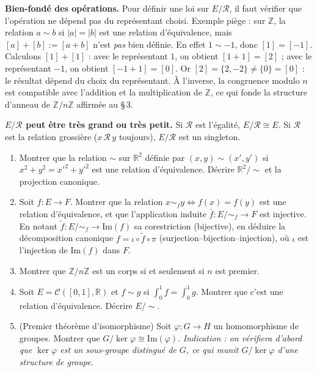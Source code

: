 \begin{mdframed}[style=cexbar]
  \textbf{Bien-fondé des opérations.}\enspace%
  Pour définir une loi sur $E/\mathcal{R}$, il faut vérifier que l'opération
  ne dépend pas du représentant choisi.
  Exemple piège : sur $\mathbb{Z}$, la relation $a\sim b$ si $|a|=|b|$ est
  une relation d'équivalence, mais $[a]+[b]:=[a+b]$ n'est \emph{pas} bien définie.
  En effet $1\sim{-1}$, donc $[1]=[{-1}]$. Calculons $[1]+[1]$ :
  avec le représentant $1$, on obtient $[1+1]=[2]$ ;
  avec le représentant $-1$, on obtient $[{-1}+1]=[0]$.
  Or $[2]=\{2,-2\}\neq\{0\}=[0]$ : le résultat dépend du choix du représentant.
  À l'inverse, la congruence modulo $n$ est compatible avec l'addition et la
  multiplication de $\mathbb{Z}$, ce qui fonde la structure d'anneau de
  $\mathbb{Z}/n\mathbb{Z}$ affirmée au §\,3.

  \smallskip\noindent
  \textbf{$E/\mathcal{R}$ peut être très grand ou très petit.}\enspace%
  Si $\mathcal{R}$ est l'égalité, $E/\mathcal{R} \cong E$.
  Si $\mathcal{R}$ est la relation grossière ($x\,\mathcal{R}\,y$ toujours), $E/\mathcal{R}$
  est un singleton.
\end{mdframed}

\vspace{6pt}
\exolabel

\begin{mdframed}[style=exobar]
  \begin{enumerate}
    \item Montrer que la relation $\sim$ sur $\mathbb{R}^2$ définie par
          $(x,y)\sim(x',y')$ si $x^2+y^2=x'^2+y'^2$ est une relation
          d'équivalence. Décrire $\mathbb{R}^2/{\sim}$ et la projection canonique.

    \item Soit $f : E \to F$. Montrer que la relation $x\sim_f y \Leftrightarrow f(x)=f(y)$
          est une relation d'équivalence, et que l'application induite
          $\bar{f} : E/{\sim_f} \to F$ est injective. En notant
          $\tilde{f} : E/{\sim_f} \to \mathrm{Im}(f)$ sa corestriction
          (bijective), en déduire la décomposition canonique
          $f = \iota \circ \tilde{f} \circ \pi$
          (surjection--bijection--injection), où $\iota$ est l'injection
          de $\mathrm{Im}(f)$ dans $F$.

    \item Montrer que $\mathbb{Z}/n\mathbb{Z}$ est un corps si et seulement si
          $n$ est premier.

    \item Soit $E = \mathcal{C}([0,1],\mathbb{R})$ et $f \sim g$ si $\int_0^1 f = \int_0^1 g$.
          Montrer que c'est une relation d'équivalence. Décrire $E/{\sim}$.

    \item (Premier théorème d'isomorphisme) Soit $\varphi : G \to H$ un homomorphisme de groupes.
          Montrer que $G/\ker\varphi \cong \mathrm{Im}(\varphi)$.
          \emph{Indication : on vérifiera d'abord que $\ker\varphi$ est un
          sous-groupe distingué de $G$, ce qui munit $G/\ker\varphi$ d'une
          structure de groupe.}
  \end{enumerate}
\end{mdframed}

